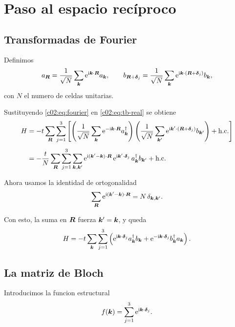 \section{Paso al espacio recíproco}

\subsection{Transformadas de Fourier}

Definimos
\begin{equation}
a_{\bm{R}} = \frac{1}{\sqrt{N}}\sum_{\bm{k}}\mathrm{e}^{\mathrm{i} \bm{k}\cdot\bm{R}} a_{\bm{k}},
\qquad
b_{\bm{R}+\bm{\delta}_j} = \frac{1}{\sqrt{N}}\sum_{\bm{k}}\mathrm{e}^{\mathrm{i} \bm{k}\cdot(\bm{R}+\bm{\delta}_j)} b_{\bm{k}},
\label{c02:eq:fourier}
\end{equation}
con \(N\) el numero de celdas unitarias.

Sustituyendo \eqref{c02:eq:fourier} en \eqref{c02:eq:tb-real} se obtiene
\begin{align}
H
&=
-t \sum_{\bm{R}}\sum_{j=1}^3
\left[
\left(\frac{1}{\sqrt{N}}\sum_{\bm{k}}\mathrm{e}^{-\mathrm{i} \bm{k}\cdot\bm{R}}a_{\bm{k}}^\dagger\right)
\left(\frac{1}{\sqrt{N}}\sum_{\bm{k}'}\mathrm{e}^{\mathrm{i} \bm{k}'\cdot(\bm{R}+\bm{\delta}_j)}b_{\bm{k}'}\right)
+ \text{h.c.}
\right]
\nonumber\\[4pt]
&=
-\frac{t}{N}\sum_{\bm{R}}\sum_{j=1}^3\sum_{\bm{k},\bm{k}'}
\mathrm{e}^{\mathrm{i}(\bm{k}'-\bm{k})\cdot\bm{R}}\,
\mathrm{e}^{\mathrm{i} \bm{k}'\cdot\bm{\delta}_j}\,
a_{\bm{k}}^\dagger b_{\bm{k}'}
+ \text{h.c.}
\label{c02:eq:before-orthogonality}
\end{align}

Ahora usamos la identidad de ortogonalidad
\begin{equation}
\sum_{\bm{R}}\mathrm{e}^{\mathrm{i}(\bm{k}'-\bm{k})\cdot\bm{R}}=N\,\delta_{\bm{k},\bm{k}'}.
\end{equation}

Con esto, la suma en \(\bm{R}\) fuerza \(\bm{k}'=\bm{k}\), y queda
\begin{equation}
H=
-t\sum_{\bm{k}}\sum_{j=1}^3
\left(
\mathrm{e}^{\mathrm{i} \bm{k}\cdot\bm{\delta}_j} a_{\bm{k}}^\dagger b_{\bm{k}}
+ \mathrm{e}^{-\mathrm{i} \bm{k}\cdot\bm{\delta}_j} b_{\bm{k}}^\dagger a_{\bm{k}}
\right).
\label{c02:eq:hk-sum}
\end{equation}

\subsection{La matriz de Bloch}

Introducimos la funcion estructural
\begin{equation}
f(\bm{k})=\sum_{j=1}^3 \mathrm{e}^{\mathrm{i} \bm{k}\cdot\bm{\delta}_j}.
\label{c02:eq:fk}
\end{equation}

